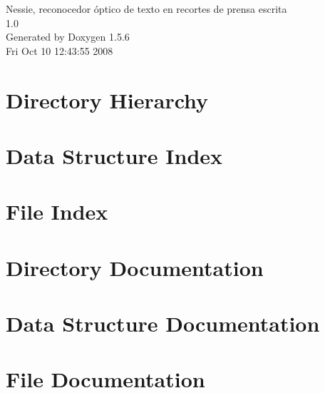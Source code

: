 \documentclass[a4paper]{book}
\begin{document}
\begin{titlepage}
\vspace*{7cm}
\begin{center}
{\Large Nessie, reconocedor óptico de texto en recortes de prensa escrita \\[1ex]\large 1.0 }\\
\vspace*{1cm}
{\large Generated by Doxygen 1.5.6}\\
\vspace*{0.5cm}
{\small Fri Oct 10 12:43:55 2008}\\
\end{center}
\end{titlepage}
\clearemptydoublepage
{}
\tableofcontents
\clearemptydoublepage
{}
\chapter{Directory Hierarchy}

\chapter{Data Structure Index}

\chapter{File Index}

\chapter{Directory Documentation}


\chapter{Data Structure Documentation}







\chapter{File Documentation}















\printindex
\end{document}
